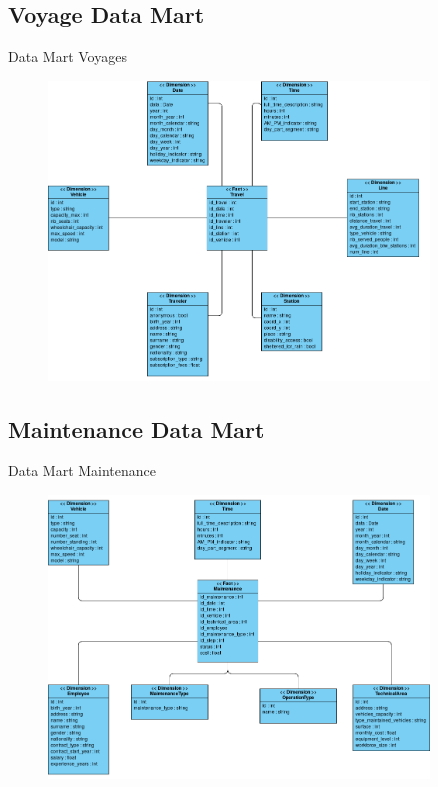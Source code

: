 \documentclass[usenames,dvipsnames]{beamer}
\begin{document}
\subsection{Voyage Data Mart}
\begin{frame}{Data Mart Voyages}
\begin{figure}[!ht]
  \centering
  \includegraphics[width=0.9\textwidth]{images/voyages_datamart.png}
\end{figure}
\end{frame}

\subsection{Maintenance Data Mart}
\begin{frame}{Data Mart Maintenance}
\begin{figure}[!ht]
  \centering
  \includegraphics[width=0.9\textwidth]{images/maintenance_datamart.png}
\end{figure}
\end{frame}
\end{document}
